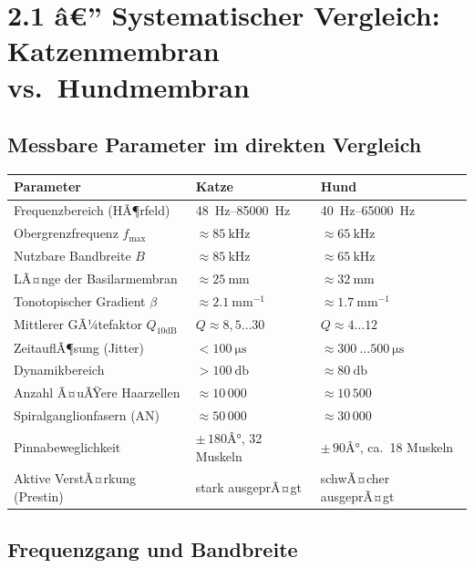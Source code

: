 ﻿\documentclass[12pt,a4paper,titlepage]{report}
\begin{document}
\section{2.1 â€” Systematischer Vergleich: Katzenmembran vs.~Hundmembran}

\subsection{Messbare Parameter im direkten Vergleich}

\begin{center}
\renewcommand{\arraystretch}{1.45}
\begin{tabular}{p{5.0cm} p{4.5cm} p{4.5cm}}
\toprule
\textbf{Parameter} & \textbf{Katze} & \textbf{Hund} \\
\midrule
Frequenzbereich (HÃ¶rfeld)
  & \SIrange{48}{85000}{\hertz}
  & \SIrange{40}{65000}{\hertz} \\
Obergrenzfrequenz $f_{\max}$
  & $\approx\SI{85}{\kilo\hertz}$
  & $\approx\SI{65}{\kilo\hertz}$ \\
Nutzbare Bandbreite $B$
  & $\approx\SI{85}{\kilo\hertz}$
  & $\approx\SI{65}{\kilo\hertz}$ \\
LÃ¤nge der Basilarmembran
  & $\approx\SI{25}{\milli\meter}$
  & $\approx\SI{32}{\milli\meter}$ \\
Tonotopischer Gradient $\beta$
  & $\approx\SI{2.1}{\milli\meter^{-1}}$
  & $\approx\SI{1.7}{\milli\meter^{-1}}$ \\
Mittlerer GÃ¼tefaktor $Q_{10\text{dB}}$
  & $Q \approx 8{,}5 \ldots 30$
  & $Q \approx 4 \ldots 12$ \\
ZeitauflÃ¶sung (Jitter)
  & $< \SI{100}{\micro\second}$
  & $\approx \SI{300}{\ldots}\SI{500}{\micro\second}$ \\
Dynamikbereich
  & $>\SI{100}{\decibel}$
  & $\approx\SI{80}{\decibel}$ \\
Anzahl Ã¤uÃŸere Haarzellen
  & $\approx 10\,000$
  & $\approx 10\,500$ \\
Spiralganglionfasern (AN)
  & $\approx 50\,000$
  & $\approx 30\,000$ \\
Pinnabeweglichkeit
  & $\pm\,180Â°$, 32 Muskeln
  & $\pm\,90Â°$, ca.~18 Muskeln \\
Aktive VerstÃ¤rkung (Prestin)
  & stark ausgeprÃ¤gt
  & schwÃ¤cher ausgeprÃ¤gt \\
\bottomrule
\end{tabular}
\end{center}

\subsection{Frequenzgang und Bandbreite}
\end{document}
